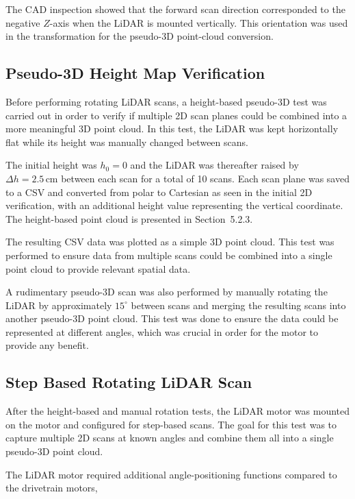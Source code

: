 The CAD inspection showed that the forward scan direction corresponded to the negative \(Z\)-axis when the LiDAR is mounted vertically.
This orientation was used in the transformation for the pseudo-3D point-cloud conversion.

\subsection{Pseudo-3D Height Map Verification}
Before performing rotating LiDAR scans, a height-based pseudo-3D test was carried out in order to verify if multiple 2D scan planes could be combined into a more meaningful 3D point cloud.
In this test, the LiDAR was kept horizontally flat while its height was manually changed between scans.

The initial height was \(h_0 = 0\) and the LiDAR was thereafter raised by \(\Delta h = 2.5\,\mathrm{cm}\) between each scan for a total of 10 scans. Each scan plane was saved to a CSV and converted from polar to Cartesian as seen in the initial 2D verification, with an additional height value representing the vertical coordinate.
The height-based point cloud is presented in Section~5.2.3.

The resulting CSV data was plotted as a simple 3D point cloud. This test was performed to ensure data from multiple scans could be combined into a single point cloud to provide relevant spatial data.

A rudimentary pseudo-3D scan was also performed by manually rotating the LiDAR by approximately \(15^\circ\) between scans and merging the resulting scans into another pseudo-3D point cloud. 
This test was done to ensure the data could be represented at different angles, which was crucial in order for the motor to provide any benefit.

\subsection{Step Based Rotating LiDAR Scan}
After the height-based and manual rotation tests, the LiDAR motor was mounted on the motor and configured for step-based scans.
The goal for this test was to capture multiple 2D scans at known angles and combine them all into a single pseudo-3D point cloud.

The LiDAR motor required additional angle-positioning functions compared to the drivetrain motors, 

